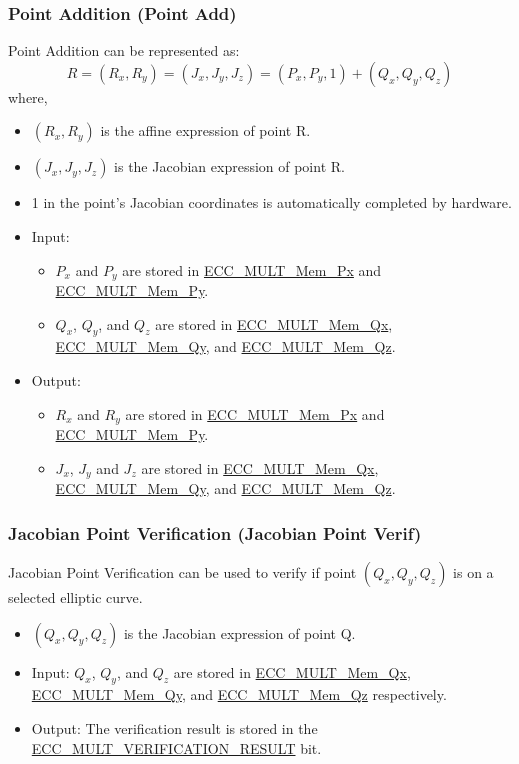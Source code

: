 \documentclass[main\_\_EN.tex]{subfiles}
\begin{document}
\subsubsection{Point Addition (Point Add)}

Point Addition can be represented as:
\[
R = (R_x,R_y) = (J_x,J_y,J_z) = (P_x,P_y,1) + (Q_x,Q_y,Q_z)
\]
where,
\begin{itemize}
    \item $(R_x,R_y)$ is the affine expression of point R.
    \item $(J_x,J_y,J_z)$ is the Jacobian expression of point R.
    \item 1 in the point's Jacobian coordinates is automatically completed by hardware.
    \item Input:
    \begin{itemize}
        \item $P_x$ and $P_y$ are stored in \hyperref[tab:ecc-memory]{ECC\_MULT\_Mem\_Px} and \hyperref[tab:ecc-memory]{ECC\_MULT\_Mem\_Py}.
        \item $Q_x$, $Q_y$, and $Q_z$ are stored in \hyperref[tab:ecc-memory]{ECC\_MULT\_Mem\_Qx}, \hyperref[tab:ecc-memory]{ECC\_MULT\_Mem\_Qy}, and \hyperref[tab:ecc-memory]{ECC\_MULT\_Mem\_Qz}.
    \end{itemize}
    \item Output:
    \begin{itemize}
        \item $R_x$ and $R_y$ are stored in \hyperref[tab:ecc-memory]{ECC\_MULT\_Mem\_Px} and \hyperref[tab:ecc-memory]{ECC\_MULT\_Mem\_Py}.
        \item $J_x$, $J_y$ and $J_z$ are stored in \hyperref[tab:ecc-memory]{ECC\_MULT\_Mem\_Qx}, \hyperref[tab:ecc-memory]{ECC\_MULT\_Mem\_Qy}, and \hyperref[tab:ecc-memory]{ECC\_MULT\_Mem\_Qz}.
    \end{itemize}
\end{itemize}

\subsubsection{Jacobian Point Verification (Jacobian Point Verif)}

Jacobian Point Verification can be used to verify if point $(Q_x,Q_y,Q_z)$ is on a selected elliptic curve.
\begin{itemize}
    \item $(Q_x,Q_y,Q_z)$ is the Jacobian expression of point Q.
    \item Input: $Q_x$, $Q_y$, and $Q_z$ are stored in \hyperref[tab:ecc-memory]{ECC\_MULT\_Mem\_Qx}, \hyperref[tab:ecc-memory]{ECC\_MULT\_Mem\_Qy}, and \hyperref[tab:ecc-memory]{ECC\_MULT\_Mem\_Qz} respectively.
    \item Output: The verification result is stored in the \hyperref[fielddesc:ECCMULTVERIFICATIONRESULT]{ECC\_MULT\_VERIFICATION\_RESULT} bit.
\end{itemize}
\end{document}
